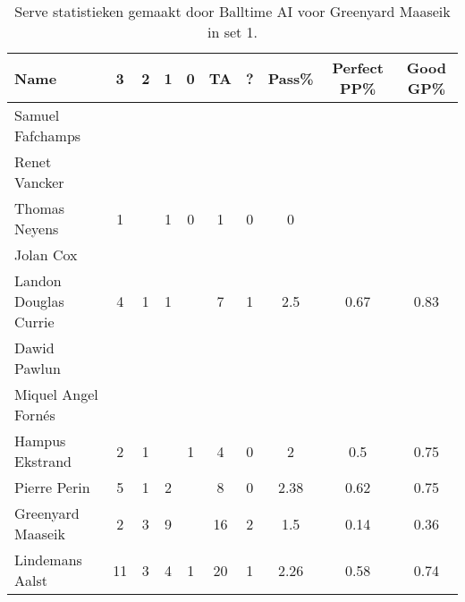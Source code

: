 \begin{table}[ht!]
  \centering
  \scriptsize
  \begin{tabular}{|l|c|c|c|c|c|c|c|c|c|} \hline
    \textbf{Name} & 3 & 2 & 1 & 0 & TA & ? & Pass\% & Perfect PP\% & Good GP\% \\ \hline
    Samuel Fafchamps &  &  &  &  &  &  &  &  &  \\
    Renet Vancker &  &  &  &  &  &  &  &  &  \\
    Thomas Neyens & 1 &  & 1 & 0 & 1 & 0 & 0 &  &  \\
    Jolan Cox &  &  &  &  &  &  &  &  &  \\
    Landon Douglas Currie & 4 & 1 & 1 &  & 7 & 1 & 2.5 & 0.67 & 0.83 \\
    Dawid Pawlun &  &  &  &  &  &  &  &  &  \\
    Miquel Angel Fornés &  &  &  &  &  &  &  &  &  \\
    Hampus Ekstrand & 2 & 1 &  & 1 & 4 & 0 & 2 & 0.5 & 0.75 \\
    Pierre Perin & 5 & 1 & 2 &  & 8 & 0 & 2.38 & 0.62 & 0.75 \\
    Greenyard Maaseik & 2 & 3 & 9 &  & 16 & 2 & 1.5 & 0.14 & 0.36 \\
    Lindemans Aalst & 11 & 3 & 4 & 1 & 20 & 1 & 2.26 & 0.58 & 0.74 \\ \hline
  \end{tabular}
  \caption[Receive statistieken gemaakt door Balltime AI voor Greenyard Maaseik in set 1]{\label{tab:PL1ReceiveMaaseik1}Serve statistieken gemaakt door Balltime AI voor Greenyard Maaseik in set 1.}
\end{table}

